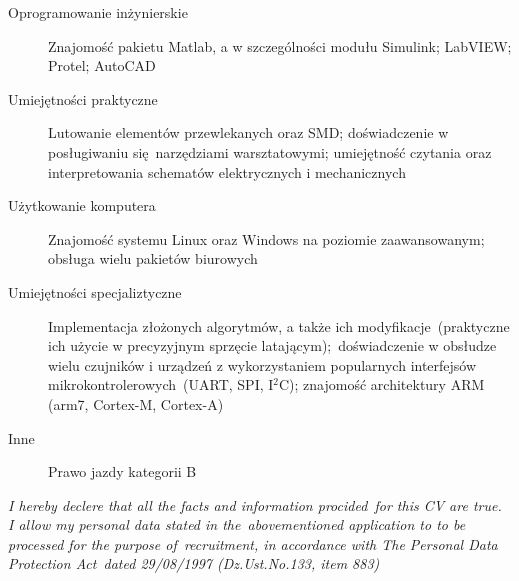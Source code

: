 \documentclass[]{friggeri-cv}
\begin{document}
\begin{description}
  \item [Oprogramowanie inżynierskie] Znajomość pakietu Matlab, a w szczególności modułu Simulink; LabVIEW; Protel; AutoCAD
  \item [Umiejętności praktyczne] Lutowanie elementów przewlekanych oraz SMD; doświadczenie w posługiwaniu się\
    narzędziami warsztatowymi; umiejętność czytania oraz interpretowania schematów elektrycznych i mechanicznych
  \item [Użytkowanie komputera] Znajomość systemu Linux oraz Windows na poziomie zaawansowanym; obsługa wielu pakietów biurowych
  \item [Umiejętności specjaliztyczne] Implementacja złożonych algorytmów, a także ich modyfikacje\
    (praktyczne ich użycie w precyzyjnym sprzęcie latającym);\ 
    doświadczenie w obsłudze wielu czujników i urządzeń z wykorzystaniem popularnych interfejsów mikrokontrolerowych\
    (UART, SPI, {\normalfont I\(^{2}\)C}); znajomość architektury ARM (arm7, Cortex-M, Cortex-A)
  \item [Inne] Prawo jazdy kategorii B
\end{description}
\null
\vfill
\emph{I hereby declere that all the facts and information procided\
for this CV are true. I allow my personal data stated in the\
abovementioned application to to be processed for the purpose of\
recruitment, in accordance with The Personal Data Protection Act\
 dated 29/08/1997 (Dz.Ust.No.133, item 883)}
% 
\end{document}
